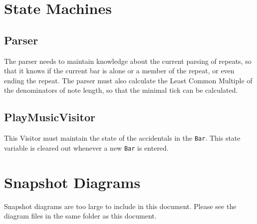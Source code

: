 \documentclass[12pt]{article}
\begin{document}
\section{State Machines}
\subsection{Parser}
The parser needs to maintain knowledge about the current parsing of
repeats, so that it knows if the current bar is alone or a member of
the repeat, or even ending the repeat. The parser must also calculate
the Least Common Multiple of the denominators of note length, so that
the minimal tick can be calculated.

\subsection{PlayMusicVisitor}
This Visitor must maintain the state of the accidentals in the
\texttt{Bar}. This state variable is cleared out whenever a new
\texttt{Bar} is entered.

\section{Snapshot Diagrams}
Snapshot diagrams are too large to include in this document. Please
see the diagram files in the same folder as this document.
\end{document}
